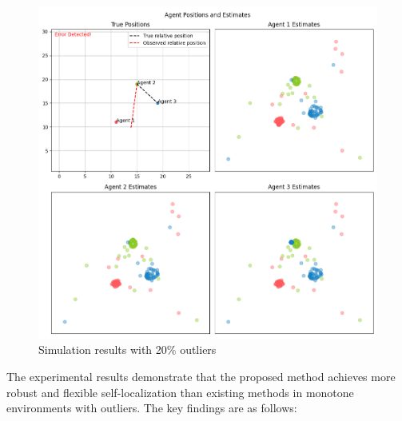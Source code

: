 \documentclass[a4paper,fleqn,10pt,twocolumn]{SICE_ISCS}
\begin{document}
\begin{figure}[t]
	\begin{center}
		\includegraphics[width=\linewidth]{Fig/error_0.2_sim.png}
		\caption{Simulation results with 20\% outliers}
		\label{fig:sim_results}
	\end{center}
	\vspace{-2mm}
\end{figure}

The experimental results demonstrate that the proposed method achieves more robust and flexible self-localization than existing methods in monotone environments with outliers. The key findings are as follows:
\end{document}
